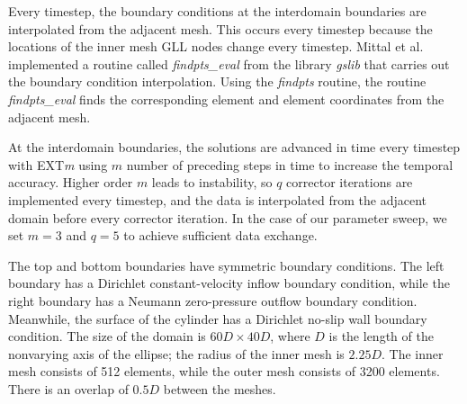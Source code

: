 Every timestep, the boundary conditions at the interdomain boundaries are interpolated from the adjacent mesh. This occurs every timestep because the locations of the inner mesh GLL nodes change every timestep. Mittal et al. \cite{mittal_nonconforming_2019} implemented a routine called \textit{findpts\_eval} from the library \textit{gslib} that carries out the boundary condition interpolation. Using the \textit{findpts} routine, the routine \textit{findpts\_eval} finds the corresponding element and element coordinates from the adjacent mesh.

At the interdomain boundaries, the solutions are advanced in time every timestep with EXT\textit{m} using $m$ number of preceding steps in time to increase the temporal accuracy. Higher order $m$ leads to instability, so $q$ corrector iterations are implemented every timestep, and the data is interpolated from the adjacent domain before every corrector iteration. In the case of our parameter sweep, we set $m=3$ and $q=5$ to achieve sufficient data exchange.
  
The top and bottom boundaries have symmetric boundary conditions. The left boundary has a Dirichlet constant-velocity inflow boundary condition, while the right boundary has a Neumann zero-pressure outflow boundary condition. Meanwhile, the surface of the cylinder has a Dirichlet no-slip wall boundary condition. The size of the domain is $60D \times 40D$, where $D$ is the length of the nonvarying axis of the ellipse; the radius of the inner mesh is $2.25D$. The inner mesh consists of 512 elements, while the outer mesh consists of 3200 elements. There is an overlap of $0.5D$ between the meshes. 

